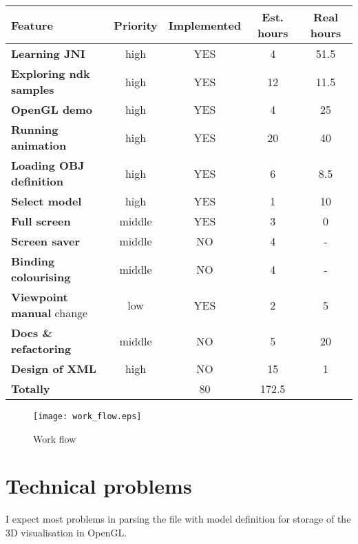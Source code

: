 \begin{tabular}{| l || c | c |  c | c |}
\hline
Feature & Priority & Implemented & Est. hours & Real hours\\
\hline
\hline
\textbf{Learning JNI} & high & YES &                 4 & 51.5\\
\textbf{Exploring ndk samples} & high & YES &       12 & 11.5\\
\textbf{OpenGL demo} & high & YES &                  4 & 25\\
\textbf{Running animation} & high & YES &           20 & 40\\
\textbf{Loading OBJ definition} & high & YES &       6 &  8.5\\
\textbf{Select model} & high & YES &                 1 & 10\\
\textbf{Full screen} & middle & YES &                3 &  0\\
\textbf{Screen saver} & middle & NO &                4 &  -\\
\textbf{Binding colourising} & middle & NO &         4 & -\\
\textbf{Viewpoint manual} change & low & YES &       2 & 5\\
\textbf{Docs \& refactoring} & middle & NO &         5 & 20\\
\textbf{Design of XML} & high & NO &                15 & 1\\
\hline
\textbf{Totally} & &                                80 & 172.5 \\
\hline
\end{tabular}
\begin{figure}
\texttt{[image: work\_flow.eps]}
\label{work_flow}
\caption{Work flow}
\end{figure}


\section*{Technical problems} %
\label{sec:Technical problems}
I expect most problems in parsing the file with model definition
for storage of the 3D visualisation in OpenGL.

